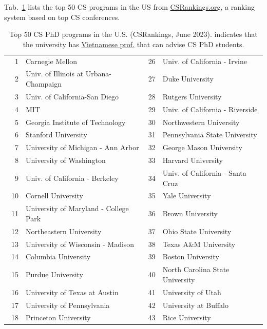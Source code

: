\documentclass[oneside,11pt]{memoir}
\newcommand{\red}[1]{{\color{red}{#1}}}
\begin{document}
Tab.~\ref{tab:ranking} lists the top 50 CS programs in the US from \href{https://www.csrankings.org}{CSRankings.org}, a ranking system  based on top CS conferences.
    \begin{table}
    \centering
    \small
    \caption{Top 50 CS PhD programs in the U.S. (CSRankings, June 2023). \red{$^*$} indicates that the university has \href{https://github.com/dynaroars/dynaroars.github.io/wiki/Viet-CS-Profs-US}{Vietnamese prof.} that can advise CS PhD students.}\label{tab:ranking}
  \begin{tabular}{rl|rl}
    \toprule
    1 & Carnegie Mellon & 26 & Univ. of California - Irvine \\
    2 & Univ. of Illinois at Urbana-Champaign\red{$^*$}  & 27 &  Duke University \\
    3 & Univ. of California-San Diego & 28 & Rutgers University\red{$^*$} \\
    4 & MIT & 29 & Univ. of California - Riverside\\
    5 & Georgia Institute of Technology         & 30 & Northwestern University\\
    6 & Stanford University& 31 & Pennsylvania State University  \\
    7 & University of Michigan - Ann Arbor\red{$^*$}   & 32& George Mason University\red{$^*$}\\  
    8 & University of Washington      &33 &  Harvard University \\
    9 &  Univ. of California - Berkeley  &34&  Univ. of California - Santa Cruz \\
    10 & Cornell University  & 35 &  Yale University \\
    11 & University of Maryland - College Park &  36& Brown University \\ 
    12 & Northeastern University\red{$^*$} &37&  Ohio State University\\
    13 & University of Wisconsin - Madison\red{$^*$}  &38& Texas A\&M University\red{$^*$} \\
    14 & Columbia University   &39 & Boston University  \\
    15 &   Purdue University  &40& North Carolina State University\\\  
    16 & University of Texas at Austin   &41 & University of Utah \\
    17 & University of Pennsylvania\red{$^*$} &42 & University at Buffalo\red{$^*$}\\
    18 & Princeton University  & 43& Rice University\\

\end{tabular}
\end{table}
\end{document}
